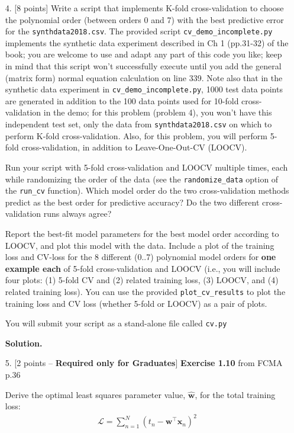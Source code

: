 \documentclass[10pt]{article}
\begin{document}
\begin{itemize}
\item[4.] [8 points]
Write a script that implements K-fold cross-validation to choose the polynomial order (between orders 0 and 7) with the best predictive error for the {\tt synthdata2018.csv}.  The provided script {\tt cv\_demo\_incomplete.py} implements the synthetic data experiment described in Ch 1 (pp.31-32) of the book; you are welcome to use and adapt any part of this code you like; keep in mind that this script won't successfully execute until you add the general (matrix form) normal equation calculation on line 339.
Note also that in the synthetic data experiment in {\tt cv\_demo\_incomplete.py}, 1000 test data points are generated in addition to the 100 data points used for 10-fold cross-validation in the demo; for this problem (problem 4), you won't have this independent test set, only the data from {\tt synthdata2018.csv} on which to perform K-fold cross-validation.  Also, for this problem, you will perform 5-fold cross-validation, in addition to Leave-One-Out-CV (LOOCV).

Run your script with 5-fold cross-validation and LOOCV multiple times, each while randomizing the order of the data (see the {\tt randomize\_data} option of the {\tt run\_cv} function).
Which model order do the two cross-validation methods predict as the best order for predictive accuracy?
Do the two different cross-validation runs always agree?

Report the best-fit model parameters for the best model order according to LOOCV, and plot this model with the data.
Include a plot of the training loss and CV-loss for the 8 different (0..7) polynomial model orders for {\bf one example each} of 5-fold cross-validation and LOOCV (i.e., you will include four plots: (1) 5-fold CV and (2) related training loss, (3) LOOCV, and (4) related training loss).  You can use the provided {\tt plot\_cv\_results} to plot the training loss and CV loss (whether 5-fold or LOOCV) as a pair of plots.

You will submit your script as a stand-alone file called {\tt cv.py}

{\bf Solution.} 




\item[5.] [2 points -- {\bf Required only for Graduates}] 
{\bf Exercise 1.10} from FCMA p.36

Derive the optimal least squares parameter value, $\mathbf{\hat{w}}$, for the total training loss:
\begin{eqnarray*}
\mathcal{L} = \sum_{n=1}^N \left( t_n - \mathbf{w}^\top \mathbf{x}_n \right)^2
\end{eqnarray*}


\end{itemize}
\end{document}
